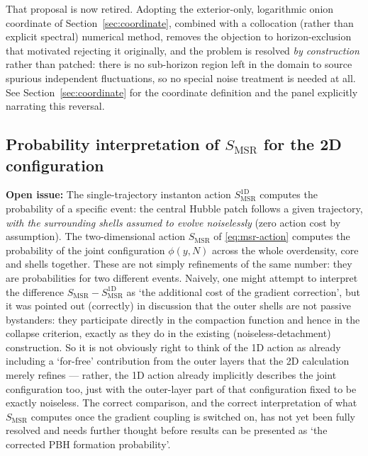 \documentclass[a4paper,11pt]{article}
\newenvironment{todo}{\begin{tcolorbox}[enhanced,breakable,colback=SussexBurntOrange!10,colframe=SussexBurntOrange!40]\small{\textsf{\textbf{Open issue:} }}}{\end{tcolorbox}}
\newcommand{\Ny}{N}                          %
\newcommand{\field}{\phi}                    %
\newcommand{\yco}{y}                         %
\begin{document}
That proposal is now retired. Adopting the exterior-only, logarithmic
onion coordinate of Section~\ref{sec:coordinate}, combined with a
collocation (rather than explicit spectral) numerical method, removes the
objection to horizon-exclusion that motivated rejecting it originally,
and the problem is resolved \emph{by construction} rather than patched:
there is no sub-horizon region left in the domain to source spurious
independent fluctuations, so no special noise treatment is needed at all.
See Section~\ref{sec:coordinate} for the coordinate definition and the
panel explicitly narrating this reversal.

\subsection{Probability interpretation of $S_{\mathrm{MSR}}$ for the 2D configuration}

\begin{todo}
The single-trajectory instanton action $S_{\mathrm{MSR}}^{\mathrm{1D}}$
computes the probability of a specific event: the central Hubble patch
follows a given trajectory, \emph{with the surrounding shells assumed to
evolve noiselessly} (zero action cost by assumption). The two-dimensional
action $S_{\mathrm{MSR}}$ of \eqref{eq:msr-action} computes the probability
of the joint configuration $\field(\yco,\Ny)$ across the whole overdensity,
core and shells together. These are not simply refinements of the same
number: they are probabilities for two different events. Naively, one
might attempt to interpret the difference $S_{\mathrm{MSR}} -
S_{\mathrm{MSR}}^{\mathrm{1D}}$ as `the additional cost of the gradient
correction', but it was pointed out (correctly) in discussion that the
outer shells are not passive bystanders: they participate directly in the
compaction function and hence in the collapse criterion, exactly as they
do in the existing (noiseless-detachment) construction. So it is not
obviously right to think of the 1D action as already including a
`for-free' contribution from the outer layers that the 2D calculation
merely refines --- rather, the 1D action already implicitly describes the
joint configuration too, just with the outer-layer part of that
configuration fixed to be exactly noiseless. The correct comparison, and
the correct interpretation of what $S_{\mathrm{MSR}}$ computes once the
gradient coupling is switched on, has not yet been fully resolved and
needs further thought before results can be presented as `the corrected
PBH formation probability'.
\end{todo}
\end{document}
